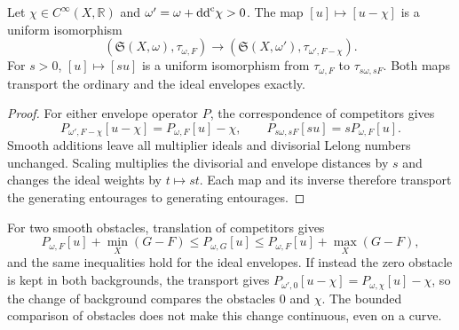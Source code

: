 \begin{proposition}\label{prop:ordinary-topology-background-transport}
Let $\chi\in C^\infty(X,\mathbb R)$ and $\omega'=\omega+\mathrm{dd}^{\mathrm{c}}\chi>0$. The map $[u]\mapsto[u-\chi]$ is a uniform isomorphism
\[
 (\mathfrak S(X,\omega),\tau_{\omega,F})
 \longrightarrow(\mathfrak S(X,\omega'),\tau_{\omega',F-\chi}).
\]
For $s>0$, $[u]\mapsto[su]$ is a uniform isomorphism from $\tau_{\omega,F}$ to $\tau_{s\omega,sF}$. Both maps transport the ordinary and the ideal envelopes exactly.
\end{proposition}
\begin{proof}
For either envelope operator $P$, the correspondence of competitors gives
\[
 P_{\omega',F-\chi}[u-\chi]=P_{\omega,F}[u]-\chi,
 \qquad P_{s\omega,sF}[su]=sP_{\omega,F}[u].
\]
Smooth additions leave all multiplier ideals and divisorial Lelong numbers unchanged. Scaling multiplies the divisorial and envelope distances by $s$ and changes the ideal weights by $t\mapsto st$. Each map and its inverse therefore transport the generating entourages to generating entourages.
\end{proof}

For two smooth obstacles, translation of competitors gives
\[
 P_{\omega,F}[u]+\min_X(G-F)
 \leq P_{\omega,G}[u]
 \leq P_{\omega,F}[u]+\max_X(G-F),
\]
and the same inequalities hold for the ideal envelopes. If instead the zero obstacle is kept in both backgrounds, the transport gives $P_{\omega',0}[u-\chi]=P_{\omega,\chi}[u]-\chi$, so the change of background compares the obstacles $0$ and $\chi$. The bounded comparison of obstacles does not make this change continuous, even on a curve.

